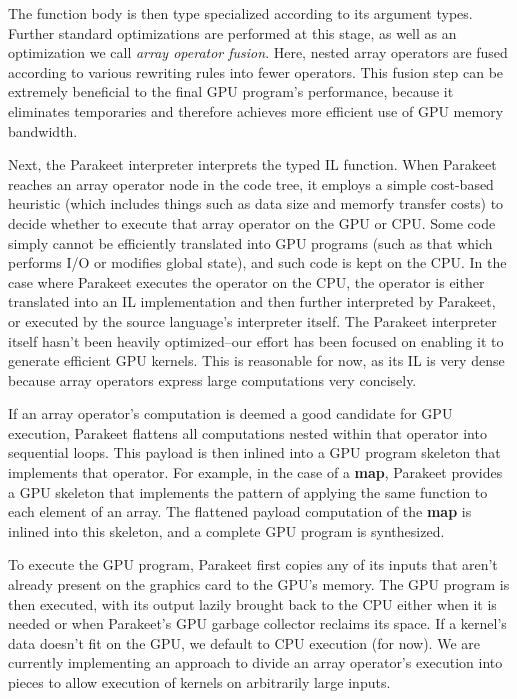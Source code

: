 \documentclass[preprint]{sigplanconf}
\begin{document}
The function body is then type specialized according to its argument
types.  Further standard optimizations are performed at this stage, as well as
an optimization we call \emph{array operator fusion}.  Here, nested array
operators are fused according to various rewriting rules into fewer operators.
This fusion step can be extremely beneficial to the final GPU
program's performance, because it eliminates temporaries and therefore 
achieves more
efficient use of GPU memory bandwidth.

Next, the Parakeet interpreter interprets the typed IL function.  When
Parakeet reaches an array operator node in the code tree, it employs a simple
cost-based heuristic (which includes things such as data size and memorfy
transfer costs) to decide whether to execute that array operator on the GPU or
CPU.  Some code simply cannot be efficiently translated into GPU programs
(such as that which performs I/O or modifies global state), and such code is
kept on the CPU. In the case where Parakeet executes the operator on the CPU,
the operator is either translated into an IL implementation and then further
interpreted by Parakeet, or executed by the source language's interpreter
itself. The Parakeet interpreter itself hasn't been heavily optimized--our
effort has been focused on enabling it to generate efficient GPU kernels.  This
is reasonable for now, as its IL is very dense because array operators
express large computations very concisely.

If an array operator's computation is deemed a good candidate for GPU
execution, Parakeet flattens all computations nested within that operator
into sequential loops.  This payload is then inlined into a GPU
program skeleton that implements that operator.  For example, in the case of a
\textbf{map}, Parakeet provides a GPU skeleton that implements the pattern of
applying the same function to each element of an array.  The
flattened payload computation of the \textbf{map} is inlined into this
skeleton, and a complete GPU program is synthesized.

To execute the GPU program, Parakeet first copies any of its inputs
that aren't already present on the graphics card to the GPU's memory.  The GPU
program is then executed, with its output lazily brought back to the CPU either
when it is needed or when Parakeet's GPU garbage collector reclaims its space.
If a kernel's data doesn't fit on the GPU, we default to CPU
execution (for now).  We are currently implementing an 
approach to divide
an array operator's execution into pieces to allow execution of
kernels on arbitrarily large inputs.
\end{document}
